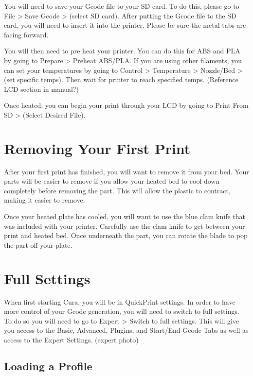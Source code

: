 You will need to save your Gcode file to your SD card. To do this, please go to File > Save Gcode > (select SD card). After putting the Gcode file to the SD card, you will need to insert it into the printer. Please be sure the metal tabs are facing forward. 

You will then need to pre heat your printer. You can do this for ABS and PLA by going to Prepare > Preheat ABS/PLA. If you are using other filaments, you can set your temperatures by going to Control > Temperature > Nozzle/Bed > (set specific temps). Then wait for printer to reach specified temps. (Reference LCD section in manual?)

Once heated, you can begin your print through your LCD by going to Print From SD > (Select Desired File).

\section{Removing Your First Print}

After your first print has finished, you will want to remove it from your bed. Your parts will be easier to remove if you allow your heated bed to cool down completely before removing the part. This will allow the plastic to contract, making it easier to remove.

Once your heated plate has cooled, you will want to use the blue clam knife that was included with your printer. Carefully use the clam knife to get between your print and heated bed. Once underneath the part, you can rotate the blade to pop the part off your plate.

\section{Full Settings}

When first starting Cura, you will be in QuickPrint settings. In order to have more control of your Gcode generation, you will need to switch to full settings. To do so you will need to go to Expert > Switch to full settings. This will give you access to the Basic, Advanced, Plugins, and Start/End-Gcode Tabs as well as access to the Expert Settings. (expert photo)

\subsection{Loading a Profile}

